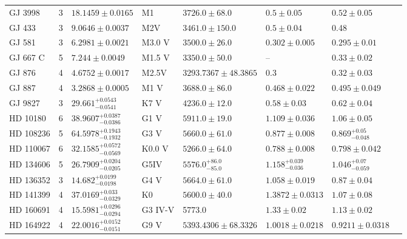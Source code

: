 \begin{tabular}{lrllllll}
GJ 3998 & 3 & $18.1459 \pm 0.0165$ & M1 & $3726.0 \pm 68.0$ & $0.5 \pm 0.05$ & $0.52 \pm 0.05$ & \cite{STEFANOV_ET_AL__2025} \\
GJ 433 & 3 & $9.0646 \pm 0.0037$ & M2V & $3461.0 \pm 150.0$ & $0.5 \pm 0.04$ & 0.48 & \cite{STASSUN_ET_AL__2017} \\
GJ 581 & 3 & $6.2981 \pm 0.0021$ & M3.0 V & $3500.0 \pm 26.0$ & $0.302 \pm 0.005$ & $0.295 \pm 0.01$ & \cite{VON_STAUFFENBERG_ET_AL__2024} \\
GJ 667 C & 5 & $7.244 \pm 0.0049$ & M1.5 V & $3350.0 \pm 50.0$ & -- & $0.33 \pm 0.02$ & \cite{ANGLADA_ESCUDE_ET_AL__2013} \\
GJ 876 & 4 & $4.6752 \pm 0.0017$ & M2.5V & $3293.7367 \pm 48.3865$ & 0.3 & $0.32 \pm 0.03$ & \cite{ROSENTHAL_ET_AL__2021} \\
GJ 887 & 4 & $3.2868 \pm 0.0005$ & M1 V & $3688.0 \pm 86.0$ & $0.468 \pm 0.022$ & $0.495 \pm 0.049$ & \cite{HARTOGH_ET_AL_2026} \\
GJ 9827 & 3 & $29.661^{+0.0543}_{-0.0541}$ & K7 V & $4236.0 \pm 12.0$ & $0.58 \pm 0.03$ & $0.62 \pm 0.04$ & \cite{PASSEGGER_ET_AL_2024} \\
HD 10180 & 6 & $38.9607^{+0.0387}_{-0.0386}$ & G1 V & $5911.0 \pm 19.0$ & $1.109 \pm 0.036$ & $1.06 \pm 0.05$ & \cite{KANE__AMP__GELINO_2014} \\
HD 108236 & 5 & $64.5978^{+0.1943}_{-0.1932}$ & G3 V & $5660.0 \pm 61.0$ & $0.877 \pm 0.008$ & $0.869^{+0.05}_{-0.048}$ & \cite{BONFANTI_ET_AL__2021} \\
HD 110067 & 6 & $32.1585^{+0.0572}_{-0.0569}$ & K0.0 V & $5266.0 \pm 64.0$ & $0.788 \pm 0.008$ & $0.798 \pm 0.042$ & \cite{LUQUE_ET_AL__2023} \\
HD 134606 & 5 & $26.7909^{+0.0204}_{-0.0205}$ & G5IV & $5576.0^{+86.0}_{-85.0}$ & $1.158^{+0.039}_{-0.036}$ & $1.046^{+0.07}_{-0.059}$ & \cite{LI_ET_AL_2024} \\
HD 136352 & 3 & $14.682^{+0.0199}_{-0.0198}$ & G4 V & $5664.0 \pm 61.0$ & $1.058 \pm 0.019$ & $0.87 \pm 0.04$ & \cite{DELREZ_ET_AL_2021} \\
HD 141399 & 4 & $37.0169^{+0.033}_{-0.0329}$ & K0 & $5600.0 \pm 40.0$ & $1.3872 \pm 0.0313$ & $1.07 \pm 0.08$ & \cite{H_EACUTE_BRARD_ET_AL__2016} \\
HD 160691 & 4 & $15.5981^{+0.0296}_{-0.0294}$ & G3 IV-V & 5773.0 & $1.33 \pm 0.02$ & $1.13 \pm 0.02$ & \cite{BENEDICT_ET_AL__2022} \\
HD 164922 & 4 & $22.0016^{+0.0152}_{-0.0151}$ & G9 V & $5393.4306 \pm 68.3326$ & $1.0018 \pm 0.0218$ & $0.9211 \pm 0.0318$ & \cite{ROSENTHAL_ET_AL__2021} \\

\end{tabular}
